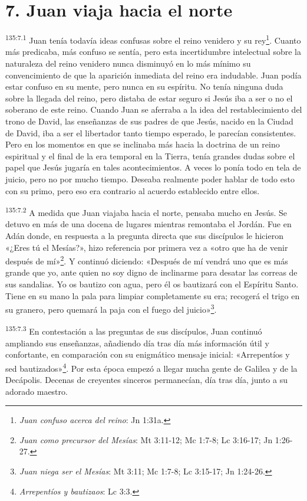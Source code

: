 \section*{7. Juan viaja hacia el norte}
\par 
\textsuperscript{135:7.1} Juan tenía todavía ideas confusas sobre el reino venidero y su rey\footnote{\textit{Juan confuso acerca del reino}: Jn 1:31a.}. Cuanto más predicaba, más confuso se sentía, pero esta incertidumbre intelectual sobre la naturaleza del reino venidero nunca disminuyó en lo más mínimo su convencimiento de que la aparición inmediata del reino era indudable. Juan podía estar confuso en su mente, pero nunca en su espíritu. No tenía ninguna duda sobre la llegada del reino, pero distaba de estar seguro si Jesús iba a ser o no el soberano de este reino. Cuando Juan se aferraba a la idea del restablecimiento del trono de David, las enseñanzas de sus padres de que Jesús, nacido en la Ciudad de David, iba a ser el libertador tanto tiempo esperado, le parecían consistentes. Pero en los momentos en que se inclinaba más hacia la doctrina de un reino espiritual y el final de la era temporal en la Tierra, tenía grandes dudas sobre el papel que Jesús jugaría en tales acontecimientos. A veces lo ponía todo en tela de juicio, pero no por mucho tiempo. Deseaba realmente poder hablar de todo esto con su primo, pero eso era contrario al acuerdo establecido entre ellos.

\par 
\textsuperscript{135:7.2} A medida que Juan viajaba hacia el norte, pensaba mucho en Jesús. Se detuvo en más de una docena de lugares mientras remontaba el Jordán. Fue en Adán donde, en respuesta a la pregunta directa que sus discípulos le hicieron «¿Eres tú el Mesías?», hizo referencia por primera vez a «otro que ha de venir después de mí»\footnote{\textit{Juan como precursor del Mesías}: Mt 3:11-12; Mc 1:7-8; Lc 3:16-17; Jn 1:26-27.}. Y continuó diciendo: «Después de mí vendrá uno que es más grande que yo, ante quien no soy digno de inclinarme para desatar las correas de sus sandalias. Yo os bautizo con agua, pero él os bautizará con el Espíritu Santo. Tiene en su mano la pala para limpiar completamente su era; recogerá el trigo en su granero, pero quemará la paja con el fuego del juicio»\footnote{\textit{Juan niega ser el Mesías}: Mt 3:11; Mc 1:7-8; Lc 3:15-17; Jn 1:24-26.}.

\par 
\textsuperscript{135:7.3} En contestación a las preguntas de sus discípulos, Juan continuó ampliando sus enseñanzas, añadiendo día tras día más información útil y confortante, en comparación con su enigmático mensaje inicial: «Arrepentíos y sed bautizados»\footnote{\textit{Arrepentíos y bautizaos}: Lc 3:3.}. Por esta época empezó a llegar mucha gente de Galilea y de la Decápolis. Decenas de creyentes sinceros permanecían, día tras día, junto a su adorado maestro.

